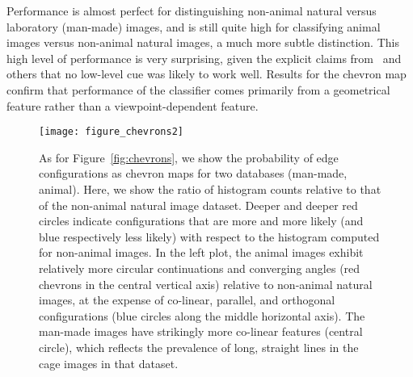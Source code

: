 \documentclass{article}%
\begin{document}
Performance is almost perfect for distinguishing non-animal natural versus
  laboratory (man-made) images, and is still quite high for
  classifying animal images versus non-animal natural images, a much
  more subtle distinction.
This high level of performance is very surprising, given the explicit
claims from~\citet{Serre07} and others that no low-level cue was likely to work well.
Results for the chevron map
confirm that performance of the classifier comes primarily from a geometrical feature 
rather than a viewpoint-dependent feature. %
%
\begin{figure}%
\texttt{[image: figure\_chevrons2]}%
\caption{%
As for Figure~\ref{fig:chevrons}, we show the probability of edge
configurations as chevron maps for two databases (man-made, animal).
Here, we show the ratio of histogram counts relative to that of the
non-animal natural image dataset.  Deeper and deeper red circles
indicate configurations that are more and more likely (and blue
respectively less likely)
with respect to the histogram computed for non-animal images.  
In the left plot, the animal
images exhibit relatively more circular continuations and converging angles (red
chevrons in the central vertical axis) relative to non-animal natural images, 
at the expense of co-linear, parallel, and orthogonal configurations (blue circles along the middle horizontal axis). %
The man-made images have strikingly more co-linear features (central circle), which reflects the prevalence of long, straight lines in the cage images in that dataset.  
\label{fig:chevrons2}}%
\end{figure}%
\end{document}
